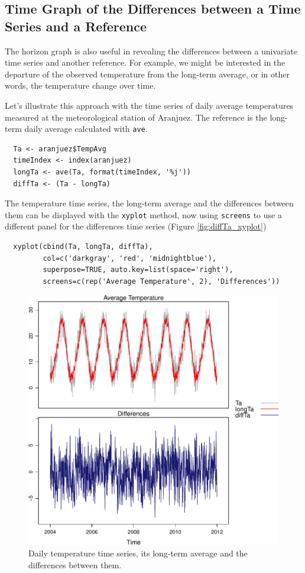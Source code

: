 \documentclass[smallroyalvopaper]{memoir}
\begin{document}
\subsection{Time Graph of the Differences between a Time Series and a Reference}
\label{sec:org8da874e}
The horizon graph is also useful in revealing the differences between
a univariate time series and another reference. For example, we
might be interested in the departure of the observed temperature
from the long-term average, or in other words, the temperature
change over time.

Let's illustrate this approach with the time series of daily
average temperatures measured at the meteorological station of
Aranjuez. The reference is the long-term daily average calculated
with \texttt{ave}.

\lstset{language=r,label= ,caption= ,captionpos=b,numbers=none}
\begin{lstlisting}
  Ta <- aranjuez$TempAvg
  timeIndex <- index(aranjuez)
  longTa <- ave(Ta, format(timeIndex, '%j'))
  diffTa <- (Ta - longTa)
\end{lstlisting}


The temperature time series, the long-term average and the
differences between them can be displayed with the \texttt{xyplot}
method, now using \texttt{screens} to use a different panel for the
differences time series (Figure \ref{fig:diffTa_xyplot})
\lstset{language=r,label= ,caption= ,captionpos=b,numbers=none}
\begin{lstlisting}
  xyplot(cbind(Ta, longTa, diffTa),
         col=c('darkgray', 'red', 'midnightblue'),
         superpose=TRUE, auto.key=list(space='right'),
         screens=c(rep('Average Temperature', 2), 'Differences'))
\end{lstlisting}

\begin{figure}[htbp]
\centering
\includegraphics[width=.9\linewidth]{figs/diffTa_xyplot.pdf}
\caption{\label{fig:org74069ea}
Daily temperature time series, its long-term average and the differences between them.}
\end{figure}
\end{document}
